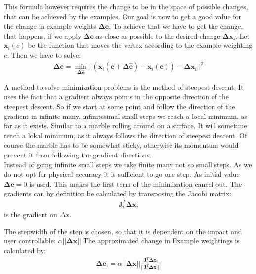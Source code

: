 \documentclass[
	11pt, 
	DIV10,
	a4paper, 
	oneside, 
	headings=normal, 
	captions=tableheading,
	final, 
	numbers=noenddot
]{scrartcl}
\begin{document}
This formula however requires the change to be in the space of possible changes, that can be achieved by the examples. Our goal is now to get a good value for the change in example weights $\bm{\Delta e}$. To achieve that we have to get the change, that happens, if we apply $\bm{\Delta e}$ as close as possible to the desired change $\bm{\Delta x_i}$. Let $\bm x_i(e)$ be the function that moves the vertex according to the example weighting $e$. Then we have to solve:
\begin{align}
\bm{\Delta e} = \min_{\bm{\Delta \hat e}}||(\bm x_i (\bm e + \bm{\Delta \hat e}) -\bm x_i (\bm e )) - \bm{\Delta x}_i ||^2
\end{align}

A method to solve minimization problems is the method of steepest descent. It uses the fact that a gradient always points in the opposite direction of the steepest descent. So if we start at some point and follow the direction of the gradient in infinite many, infinitesimal small steps we reach a local minimum, as far as it exists. Similar to a marble rolling around on a surface. It will sometime reach a lokal minimum, as it always follows the direction of steepest descent. Of course the marble has to be somewhat sticky, otherwise its momentum would prevent it from following the gradient directions.\\
Instead of going infinite small steps we take finite many not so small steps.
As we do not opt for physical accuracy it is sufficient to go one step. As initial value $\bm{\Delta e} = 0$ is used. This makes the first term of the minimization cancel out. The gradients can by definition be calculated by transposing the Jacobi matrix:
\begin{align}
\bm J_i^T \bm{\Delta x}_i
\end{align}
is the gradient on $\Delta x$.

The stepwidth of the step is chosen, so that it is dependent on the impact and user controllable: $\alpha ||\bm{\Delta x}||$
The approximated change in Example weightings is calculated by:
\begin{align}
\bm{\Delta e}_i = \alpha ||\bm{\Delta x}|| \frac{\bm J_i^T \bm{\Delta x}_i}{||\bm J_i^T \bm{\Delta x}_i||}
\end{align}
\end{document}
